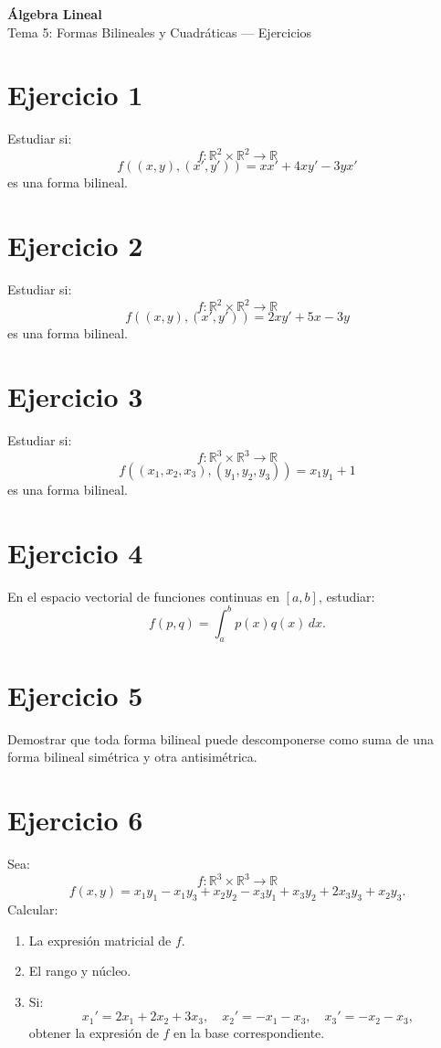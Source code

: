 \documentclass[11pt,a4paper]{article}
\newcommand{\R}{\mathbb{R}}
\begin{document}
\begin{center}
{\LARGE\bfseries Álgebra Lineal}\\[0.4em]
{\Large Tema 5: Formas Bilineales y Cuadráticas --- Ejercicios}
\end{center}

\section{Ejercicio 1}
Estudiar si:
\[
f:\R^2\times\R^2\to\R
\]
\[
f((x,y),(x',y'))=xx'+4xy'-3yx'
\]
es una forma bilineal.

\section{Ejercicio 2}
Estudiar si:
\[
f:\R^2\times\R^2\to\R
\]
\[
f((x,y),(x',y'))=2xy'+5x-3y
\]
es una forma bilineal.

\section{Ejercicio 3}
Estudiar si:
\[
f:\R^3\times\R^3\to\R
\]
\[
f((x_1,x_2,x_3),(y_1,y_2,y_3))=x_1y_1+1
\]
es una forma bilineal.

\section{Ejercicio 4}
En el espacio vectorial de funciones continuas en $[a,b]$, estudiar:
\[
f(p,q)=\int_a^bp(x)q(x)\,dx.
\]

\section{Ejercicio 5}
Demostrar que toda forma bilineal puede descomponerse como suma de una forma bilineal simétrica y otra antisimétrica.

\section{Ejercicio 6}
Sea:
\[
f:\R^3\times\R^3\to\R
\]
\[
f(x,y)=x_1y_1-x_1y_3+x_2y_2-x_3y_1+x_3y_2+2x_3y_3+x_2y_3.
\]
Calcular:
\begin{enumerate}[label=\alph*)]
\item La expresión matricial de $f$.
\item El rango y núcleo.
\item Si:
\[
x_1'=2x_1+2x_2+3x_3,\quad
x_2'=-x_1-x_3,\quad
x_3'=-x_2-x_3,
\]
obtener la expresión de $f$ en la base correspondiente.
\end{enumerate}
\end{document}
